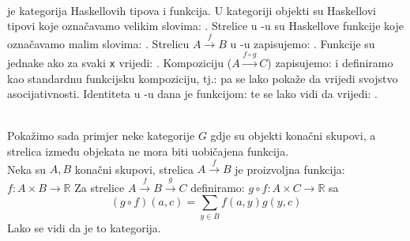 	\begin{example}\ \\
	
  \noindent {} je kategorija Haskellovih tipova i funkcija. U
   kategoriji objekti su Haskellovi tipovi koje označavamo velikim
  slovima:
  .
  Strelice u -u su Haskellove funkcije koje označavamo malim
  slovima:
  .
  Strelicu $A \xrightarrow{f} B$ u -u zapisujemo:
  .
  Funkcije
  su jednake ako za svaki \texttt{x} vrijedi:
    .
  Kompoziciju ($A \xrightarrow{f \circ g} C$) zapisujemo:
    i definiramo kao standardnu funkcijsku kompoziciju, tj.:
  pa se lako pokaže da vrijedi svojstvo asocijativnosti.
  Identiteta u -u dana je funkcijom:
  te se lako vidi da vrijedi:
    .\\
  \end{example}

	\begin{example}\ \\
	
    \noindent Pokažimo sada primjer neke kategorije $G$ gdje su objekti konačni skupovi,
    a strelica između objekata ne mora biti uobičajena funkcija.\\
    Neka su $A, B$ konačni skupovi, strelica $A \xrightarrow{f} B$ je
    proizvoljna funkcija: $f:A \times B \rightarrow \mathbb{R}$
    Za strelice $A \xrightarrow{f} B \xrightarrow{g} C$ definiramo: $g \circ f:A \times C \rightarrow \mathbb{R}$
    sa
    \begin{equation*}
      (g \circ f)(a, c) = \sum_{y \in B}f(a, y)g(y,c)
    \end{equation*}
    Lako se vidi da je to kategorija.\\
\end{example}

